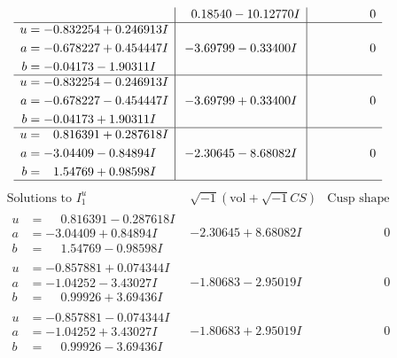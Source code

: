 \documentclass[1p]{elsarticle_modified}
\theoremstyle{definition}
\newcommand{\I}{\sqrt{-1}}
\begin{document}
$$\begin{array}{c|c|c}
 & \phantom{-}0.18540 - 10.12770 I & \phantom{-0.000000 } 0 \\ \hline\begin{aligned}
u &= -0.832254 + 0.246913 I \\
a &= -0.678227 + 0.454447 I \\
b &= -0.04173 - 1.90311 I\end{aligned}
 & -3.69799 - 0.33400 I & \phantom{-0.000000 } 0 \\ \hline\begin{aligned}
u &= -0.832254 - 0.246913 I \\
a &= -0.678227 - 0.454447 I \\
b &= -0.04173 + 1.90311 I\end{aligned}
 & -3.69799 + 0.33400 I & \phantom{-0.000000 } 0 \\ \hline\begin{aligned}
u &= \phantom{-}0.816391 + 0.287618 I \\
a &= -3.04409 - 0.84894 I \\
b &= \phantom{-}1.54769 + 0.98598 I\end{aligned}
 & -2.30645 - 8.68082 I & \phantom{-0.000000 } 0\\
 \hline 
 \end{array}$$\newpage$$\begin{array}{c|c|c}  
\text{Solutions to }I^u_{1}& \I (\text{vol} + \sqrt{-1}CS) & \text{Cusp shape}\\
 \hline 
\begin{aligned}
u &= \phantom{-}0.816391 - 0.287618 I \\
a &= -3.04409 + 0.84894 I \\
b &= \phantom{-}1.54769 - 0.98598 I\end{aligned}
 & -2.30645 + 8.68082 I & \phantom{-0.000000 } 0 \\ \hline\begin{aligned}
u &= -0.857881 + 0.074344 I \\
a &= -1.04252 - 3.43027 I \\
b &= \phantom{-}0.99926 + 3.69436 I\end{aligned}
 & -1.80683 - 2.95019 I & \phantom{-0.000000 } 0 \\ \hline\begin{aligned}
u &= -0.857881 - 0.074344 I \\
a &= -1.04252 + 3.43027 I \\
b &= \phantom{-}0.99926 - 3.69436 I\end{aligned}
 & -1.80683 + 2.95019 I & \phantom{-0.000000 } 0 \\ \hline\begin{aligned}

\end{aligned}
\end{array}$$
\end{document}
